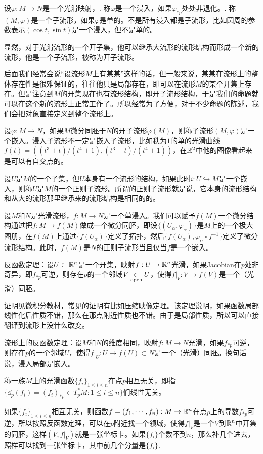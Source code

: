 \para 设$\varphi:M\to N$是一个光滑映射，. 称$\varphi$是一个浸入，如果$\varphi_{*p}$处处非退化。. 称$(M,\varphi)$是一个子流形，如果$\varphi$是单的。不是所有浸入都是子流形，比如圆周的参数表示$(\cos t,\sin t)$是一个浸入，但不是单的。

显然，对于光滑流形的一个开子集，他可以继承大流形的流形结构而形成一个新的流形，他是一个子流形，被称为开子流形。

后面我们经常会说“设流形$M$上有某某”这样的话，但一般来说，某某在流形上的整体存在性是很难保证的，往往他只是局部存在，即可以在流形$M$的某个开集上存在。但是注意到$M$的开集现在也有流形结构，即开子流形结构，于是我们的命题就可以在这个新的流形上正常工作了。所以经常为了方便，对于不少命题的陈述，我们会把对象直接定义到整个流形上。

\para 设$\varphi:M\to N$，如果$M$微分同胚于$N$的开子流形$\varphi(M)$，则称子流形$(M,\varphi)$是一个嵌入。浸入子流形不一定是嵌入子流形，比如秩为$1$的单的光滑曲线$f(t)=((t^3+t)/(t^4+1),(t^3-t)/(t^4+1))$，在$\mathbb{R}^2$中他的图像看起来是可以有自交点的。

\para 设$U$是$M$的一个子集，但$U$本身有一个流形的结构，如果此时$i:U\hookrightarrow M$是一个嵌入，则称$U$是$M$的一个正则子流形。所谓的正则子流形就是说，它本身的流形结构和从大的流形那里继承来的流形结构是相同的的。

设$M$和$N$是光滑流形，$f:M\to N$是一个单浸入。我们可以赋予$f(M)$一个微分结构通过把$f:M\to f(M)$做成一个微分同胚，即设$\{(U_\alpha,\varphi_\alpha)\}$是$M$上的一个极大图册，在$f(M)$上通过$\{f(U_\alpha)\}$定义了拓扑，然后$\{f(U_\alpha),\varphi_\alpha\circ f^{-1}\}$定义了微分流形结构。此时，$f(M)$是$N$的正则子流形当且仅当$f$是一个嵌入。

\para 反函数定理：设$U\subset \mathbb{R}^n$是一个开集，映射$f:U\to \mathbb{R}^n$光滑，如果Jacobian在$p$处非奇异，即$f_{*p}$可逆，则存在$p$的一个邻域$V\underset{\mathrm{open}}{\subset} U$，使得$f|_V:V\to f(V)$是一个（光滑）同胚。

证明见微积分教材，常见的证明有比如压缩映像定理。该定理说明，如果函数局部线性化后性质不错，那么在那点附近性质也不错。由于是局部性质，所以可以直接翻译到流形上没什么改变。

\theo 流形上的反函数定理：设$M$和$N$的维度相同，映射$f:M\to N$光滑，如果$f_{*p}$可逆，则存在$p$的一个邻域$U$，使得$f|_U:U\to f(U)\subset N$是一个（光滑）同胚。换句话说，浸入局部是嵌入。

\para 称一族$M$上的光滑函数$\{f_i\}_{1\leq i\leq n}$在点$p$相互无关，即指$\{\dd_p (f_i)=(f_i)_{*p}\in T_p^*M:1\leq i\leq n\}$们线性无关。

如果$\{f_i\}_{1\leq i\leq n}$相互无关，则函数$f=(f_1,\cdots,f_n):M\to \mathbb{R}^n$在点$p$上的导数$f_{*p}$可逆，所以按照反函数定理，可以在$p$附近找一个领域，使得$f|_V$是一个$V$到$\mathbb{R}^n$中开集的同胚，这样$(V,f|_V)$就是一张坐标卡。如果$\{f_i\}$个数不到$n$，那么补几个进去，照样可以找到一张坐标卡，其中前几个分量是$\{f_i\}$.

